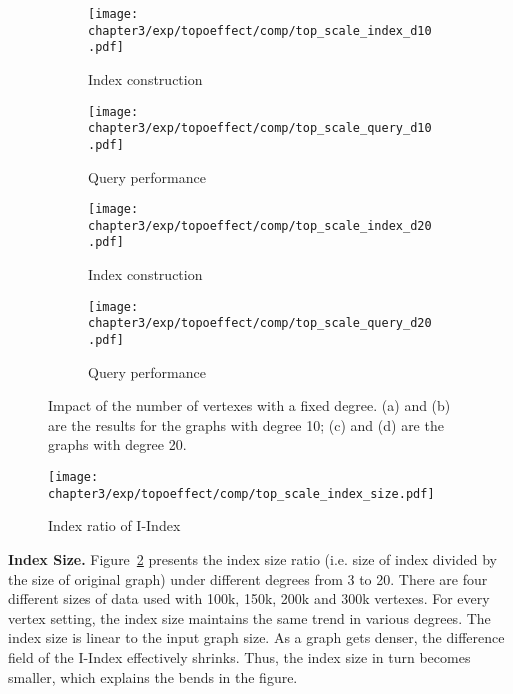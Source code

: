 \begin{figure}[t]
\centering
\begin{subfigure}{0.45\linewidth}
  \centering
  \texttt{[image: chapter3/exp/topoeffect/comp/top\_scale\_index\_d10.pdf]}
  \caption{Index construction }
\end{subfigure}
\begin{subfigure}{0.45\linewidth}
  \centering
  \texttt{[image: chapter3/exp/topoeffect/comp/top\_scale\_query\_d10.pdf]}
  \caption{Query performance}
\end{subfigure}
\begin{subfigure}{0.45\linewidth}
  \centering
  \texttt{[image: chapter3/exp/topoeffect/comp/top\_scale\_index\_d20.pdf]}
  \caption{Index construction}
\end{subfigure}
\begin{subfigure}{0.45\linewidth}
  \centering
  \texttt{[image: chapter3/exp/topoeffect/comp/top\_scale\_query\_d20.pdf]}
  \caption{Query performance}
\end{subfigure}
\caption{Impact of the number of vertexes with a fixed degree. (a) and (b) 
are the results for the graphs with degree 10; (c) and (d) 
are the graphs with degree 20. }
\label{fig:pi_effect2}
\end{figure}

\begin{figure}[h]
\centering
\texttt{[image: chapter3/exp/topoeffect/comp/top\_scale\_index\_size.pdf]}
\caption{Index ratio of I-Index}
\label{fig:top-index-size}
\end{figure}


\textbf{Index Size.} Figure~\ref{fig:top-index-size} presents
the index size ratio (i.e. size of index divided by the size of original graph) under different degrees from 3 to 20. 
There are four different sizes of data used with 100k, 150k, 200k and 300k vertexes.  
For every vertex setting, the index size maintains the same trend in various degrees. The index size is linear to the input graph size. 
As a graph gets denser, the difference field of the I-Index
effectively shrinks. Thus, the index size in turn becomes smaller, which explains the bends in the figure.




